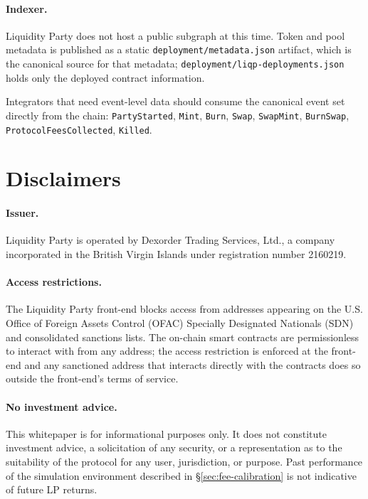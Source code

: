\documentclass[11pt]{article}
\begin{document}
\paragraph{Indexer.}
Liquidity Party does not host a public subgraph at this time. Token and
pool metadata is published as a static \texttt{deployment/metadata.json}
artifact, which is the canonical source for that metadata;
\texttt{deployment/liqp-deployments.json} holds only the deployed
contract information.

Integrators that need event-level data should consume the canonical event
set directly from the chain:
\texttt{PartyStarted}, \texttt{Mint}, \texttt{Burn}, \texttt{Swap},
\texttt{SwapMint}, \texttt{BurnSwap},
\texttt{ProtocolFeesCollected}, \texttt{Killed}.

\section{Disclaimers}
\label{sec:disclaim}

\paragraph{Issuer.}
Liquidity Party is operated by Dexorder Trading Services, Ltd., a company
incorporated in the British Virgin Islands under registration
number 2160219.

\paragraph{Access restrictions.}
The Liquidity Party front-end blocks access from addresses appearing on the
U.S. Office of Foreign Assets Control (OFAC) Specially Designated Nationals
(SDN) and consolidated sanctions lists. The on-chain smart contracts are
permissionless to interact with from any address; the access restriction is
enforced at the front-end and any sanctioned address that interacts
directly with the contracts does so outside the front-end's terms of
service.

\paragraph{No investment advice.}
This whitepaper is for informational purposes only. It does not constitute
investment advice, a solicitation of any security, or a representation as
to the suitability of the protocol for any user, jurisdiction, or
purpose. Past performance of the simulation environment described in
\S\ref{sec:fee-calibration} is not indicative of future LP returns.
\end{document}
